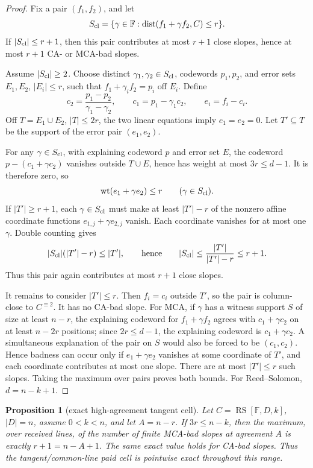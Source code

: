 \documentclass[a4paper,11pt]{amsart}
\newtheorem{proposition}[proposition]{Proposition}
\theoremstyle{remark}
\newcommand{\F}{\mathbb F}
\newcommand{\RS}{\operatorname{RS}}
\newcommand{\dist}{\operatorname{dist}}
\newcommand{\wt}{\operatorname{wt}}
\begin{document}
\begin{proof}
Fix a pair \((f_1,f_2)\), and let
\[
        S_{\rm cl}=\{\gamma\in\F:\dist(f_1+\gamma f_2,C)\le r\}.
\]
If \(|S_{\rm cl}|\le r+1\), then this pair contributes at most \(r+1\) close slopes, hence at most \(r+1\) CA- or MCA-bad slopes.

Assume \(|S_{\rm cl}|\ge2\).  Choose distinct \(\gamma_1,\gamma_2\in S_{\rm cl}\), codewords \(p_1,p_2\), and error sets \(E_1,E_2\), \(|E_i|\le r\), such that \(f_1+\gamma_i f_2=p_i\) off \(E_i\).  Define
\[
        c_2=\frac{p_1-p_2}{\gamma_1-\gamma_2},
        \qquad
        c_1=p_1-\gamma_1c_2,
        \qquad
        e_i=f_i-c_i .
\]
Off \(T=E_1\cup E_2\), \(|T|\le2r\), the two linear equations imply \(e_1=e_2=0\).  Let \(T'\subseteq T\) be the support of the error pair \((e_1,e_2)\).

For any \(\gamma\in S_{\rm cl}\), with explaining codeword \(p\) and error set \(E\), the codeword \(p-(c_1+\gamma c_2)\) vanishes outside \(T\cup E\), hence has weight at most \(3r\le d-1\).  It is therefore zero, so
\[
        \wt(e_1+\gamma e_2)\le r
        \qquad(\gamma\in S_{\rm cl}).
\]
If \(|T'|\ge r+1\), each \(\gamma\in S_{\rm cl}\) must make at least \(|T'|-r\) of the nonzero affine coordinate functions \(e_{1,j}+\gamma e_{2,j}\) vanish.  Each coordinate vanishes for at most one \(\gamma\).  Double counting gives
\[
        |S_{\rm cl}|(|T'|-r)\le |T'|,
        \qquad\text{hence}\qquad
        |S_{\rm cl}|\le \frac{|T'|}{|T'|-r}\le r+1.
\]
Thus this pair again contributes at most \(r+1\) close slopes.

It remains to consider \(|T'|\le r\).  Then \(f_i=c_i\) outside \(T'\), so the pair is column-close to \(C^{\equiv2}\).  It has no CA-bad slope.  For MCA, if \(\gamma\) has a witness support \(S\) of size at least \(n-r\), the explaining codeword for \(f_1+\gamma f_2\) agrees with \(c_1+\gamma c_2\) on at least \(n-2r\) positions; since \(2r\le d-1\), the explaining codeword is \(c_1+\gamma c_2\).  A simultaneous explanation of the pair on \(S\) would also be forced to be \((c_1,c_2)\).  Hence badness can occur only if \(e_1+\gamma e_2\) vanishes at some coordinate of \(T'\), and each coordinate contributes at most one slope.  There are at most \(|T'|\le r\) such slopes.  Taking the maximum over pairs proves both bounds.  For Reed--Solomon, \(d=n-k+1\).
\end{proof}

\begin{proposition}[exact high-agreement tangent cell]\label{prop:exact-tangent-cell}
Let \(C=\RS[\F,D,k]\), \(|D|=n\), assume \(0<k<n\), and let \(A=n-r\).  If \(3r\le n-k\), then the maximum, over received lines, of the number of finite MCA-bad slopes at agreement \(A\) is exactly \(r+1=n-A+1\).  The same exact value holds for CA-bad slopes.  Thus the tangent/common-line paid cell is pointwise exact throughout this range.
\end{proposition}
\end{document}
